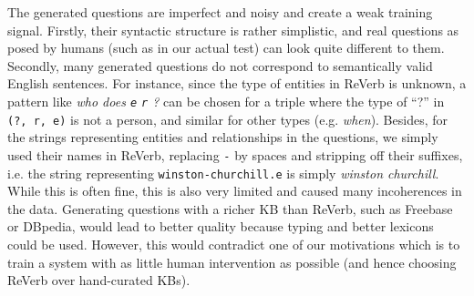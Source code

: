 \documentclass[runningheads,a4paper]{llncs}
\newcommand{\kb}[1]{{\small\texttt{#1}}\xspace}
\newcommand{\dbp}{{\sc DBpedia}\xspace}
\newcommand{\fb}{{\sc Freebase}\xspace}
\newcommand{\rv}{{\sc ReVerb}\xspace}
\begin{document}
The generated questions are imperfect and noisy and create a weak training signal. 
Firstly, their syntactic structure is rather simplistic, and real questions as posed by humans (such as in our actual test) can look quite different to them.
Secondly,  many generated questions do not correspond to semantically valid English sentences.
For instance, since the type of entities in \rv is unknown, a pattern like {\it who does \kb{e} \kb{r} ?} can be chosen for a triple where the type of “?” in \kb{(?, r, e)} is not a person, and similar for other types (e.g. {\it when}). 
Besides, for the strings representing entities and relationships in the questions, we simply used their names in \rv, replacing \kb{-} by spaces and stripping off their suffixes, i.e. the string representing \kb{winston-churchill.e} is simply {\it winston churchill}.
While this is often fine, this is also very limited and caused many incoherences in the data.
Generating questions with a richer KB than \rv, such as \fb or \dbp, would lead to better quality because typing and better lexicons could be used. However, this would contradict one of our motivations which is to train a system with as little human intervention as possible (and hence choosing \rv over hand-curated KBs).
\end{document}
